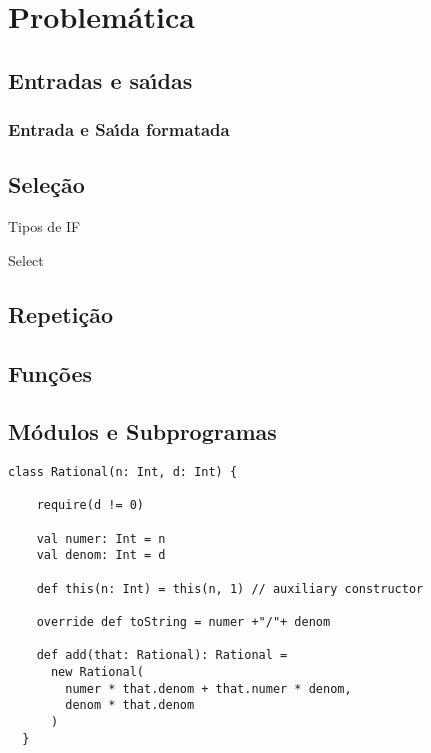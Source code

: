 

\chapter{Problemática}


    \section{Entradas e sa\'{\i}das}

          \subsection{Entrada e Sa\'{\i}da formatada}


    \section{Sele\c{c}\~{a}o}
    Tipos de IF

    Select

    \section{Repeti\c{c}\~{a}o}

    \section{Fun\c{c}\~{o}es}



    \section{M\'{o}dulos e Subprogramas}


   \begin{lstlisting}
class Rational(n: Int, d: Int) {

    require(d != 0)

    val numer: Int = n
    val denom: Int = d

    def this(n: Int) = this(n, 1) // auxiliary constructor

    override def toString = numer +"/"+ denom

    def add(that: Rational): Rational =
      new Rational(
        numer * that.denom + that.numer * denom,
        denom * that.denom
      )
  }
    \end{lstlisting}
